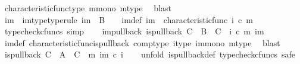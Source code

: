 \begin{isabellebody}
\ characteristic{\isacharunderscore}{\kern0pt}func{\isacharunderscore}{\kern0pt}type\ m{\isacharunderscore}{\kern0pt}mono\ m{\isacharunderscore}{\kern0pt}type\ \isamarkupfalse%
\ blast\isanewline
\ \ \isamarkupfalse%
\ {\isasymchi}im\ \ {\isasymchi}im{\isacharunderscore}{\kern0pt}type{\isacharbrackleft}{\kern0pt}type{\isacharunderscore}{\kern0pt}rule{\isacharbrackright}{\kern0pt}{\isacharcolon}{\kern0pt}\ {\isachardoublequoteopen}{\isasymchi}im\ {\isacharcolon}{\kern0pt}\ B\ {\isasymrightarrow}\ {\isasymOmega}{\isachardoublequoteclose}\ \ {\isasymchi}im{\isacharunderscore}{\kern0pt}def{\isacharcolon}{\kern0pt}\ {\isachardoublequoteopen}{\isasymchi}im\ {\isacharequal}{\kern0pt}\ characteristic{\isacharunderscore}{\kern0pt}func\ {\isacharparenleft}{\kern0pt}i\ {\isasymcirc}\isactrlsub c\ m{\isacharparenright}{\kern0pt}{\isachardoublequoteclose}\isanewline
\ \ \ \ \isamarkupfalse%
\ {\isacharparenleft}{\kern0pt}typecheck{\isacharunderscore}{\kern0pt}cfuncs{\isacharcomma}{\kern0pt}\ simp{\isacharparenright}{\kern0pt}\isanewline
\ \ \isamarkupfalse%
\ {\isasymchi}im{\isacharunderscore}{\kern0pt}pullback{\isacharcolon}{\kern0pt}\ {\isachardoublequoteopen}is{\isacharunderscore}{\kern0pt}pullback\ C\ {\isasymone}\ B\ {\isasymOmega}\ {\isacharparenleft}{\kern0pt}{\isasymbeta}\isactrlbsub C\isactrlesub {\isacharparenright}{\kern0pt}\ {\isasymt}\ {\isacharparenleft}{\kern0pt}i\ {\isasymcirc}\isactrlsub c\ m{\isacharparenright}{\kern0pt}\ {\isasymchi}im{\isachardoublequoteclose}\isanewline
\ \ \ \ \isamarkupfalse%
\ {\isasymchi}im{\isacharunderscore}{\kern0pt}def\ characteristic{\isacharunderscore}{\kern0pt}func{\isacharunderscore}{\kern0pt}is{\isacharunderscore}{\kern0pt}pullback\ comp{\isacharunderscore}{\kern0pt}type\ i{\isacharunderscore}{\kern0pt}type\ im{\isacharunderscore}{\kern0pt}mono\ m{\isacharunderscore}{\kern0pt}type\ \isamarkupfalse%
\ blast\isanewline
\ \ \isamarkupfalse%
\ {\isachardoublequoteopen}is{\isacharunderscore}{\kern0pt}pullback\ C\ {\isasymone}\ A\ {\isasymOmega}\ {\isacharparenleft}{\kern0pt}{\isasymbeta}\isactrlbsub C\isactrlesub {\isacharparenright}{\kern0pt}\ {\isasymt}\ m\ {\isacharparenleft}{\kern0pt}{\isasymchi}im\ {\isasymcirc}\isactrlsub c\ i{\isacharparenright}{\kern0pt}{\isachardoublequoteclose}\isanewline
\ \ \isamarkupfalse%
\ {\isacharparenleft}{\kern0pt}unfold\ is{\isacharunderscore}{\kern0pt}pullback{\isacharunderscore}{\kern0pt}def{\isacharcomma}{\kern0pt}\ typecheck{\isacharunderscore}{\kern0pt}cfuncs{\isacharcomma}{\kern0pt}\ safe{\isacharparenright}{\kern0pt}\isanewline

\end{isabellebody}
